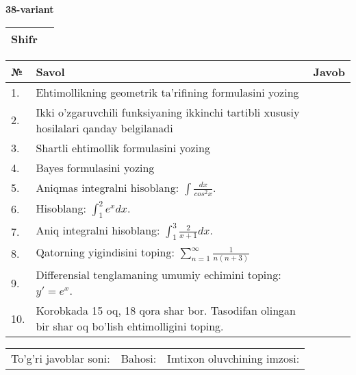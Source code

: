 \documentclass{article}
\begin{document}
  \egroup
  
  \newpage
  
  
  \textbf{38-variant}\\
  
  \bgroup
  \def\arraystretch{1.6} %
  
  \begin{tabular}{|m{5.7cm}|m{9.5cm}|}
  \hline
  Shifr & \\
  \hline
  \end{tabular}
  
  \vspace{1cm}
  
  \begin{tabular}{|m{0.7cm}|m{10cm}|m{4cm}|}
  \hline
  № & Savol & Javob \\
  \hline
  1. & Ehtimollikning geometrik ta'rifining formulasini yozing &  \\
  \hline
  2. & Ikki o'zgaruvchili funksiyaning ikkinchi tartibli xususiy hosilalari qanday belgilanadi &  \\
  \hline
  3. & Shartli ehtimollik formulasini yozing &  \\
  \hline
  4. & Bayes formulasini yozing &  \\
  \hline
  5. & Aniqmas integralni hisoblang: \(\int \frac{dx}{cos^{2}x}\). &  \\
  \hline
  6. & Hisoblang: \(\int_{1}^{2}{e^{x}dx}\). &  \\
  \hline
  7. & Aniq integralni hisoblang: \(\int_{1}^{3}\frac{2}{x + 1}dx\). &  \\
  \hline
  8. & Qatorning yigindisini toping: \(\sum_{n = 1}^{\infty}\frac{1}{n(n + 3)}\) &  \\
  \hline
  9. & Differensial tenglamaning umumiy echimini toping: \(y' = e^{x}\). &  \\
  \hline
  10. & Korobkada 15 oq, 18 qora shar bor. Tasodifan olingan bir shar oq bo'lish ehtimolligini toping. &  \\
  \hline
  \end{tabular}
  
  \vspace{1cm}
  
  \begin{tabular}{lll}
  To'g'ri javoblar soni: \underline{\hspace{1.5cm}} & 
  Bahosi: \underline{\hspace{1.5cm}} & 
  Imtixon oluvchining imzosi: \underline{\hspace{2cm}} \\
  \end{tabular}
  
\end{document}
